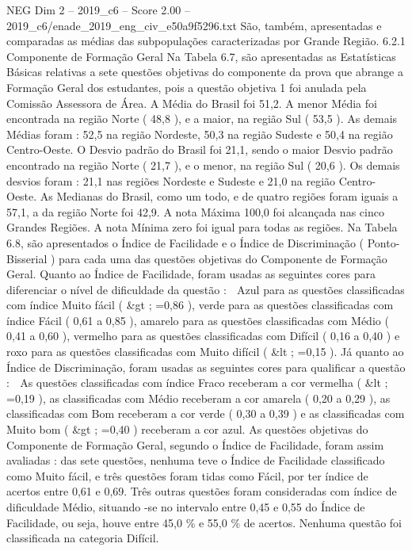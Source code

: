 \begin{textsample}{NEG Dim 2 – 2019\_c6 – Score 2.00 – 2019\_c6/enade\_2019\_eng\_civ\_e50a9f5296.txt}
São, também, apresentadas e comparadas as médias das subpopulações caracterizadas por Grande Região. 6.2.1 Componente de Formação Geral Na Tabela 6.7, são apresentadas as Estatísticas Básicas relativas a sete questões objetivas do componente da prova que abrange a Formação Geral dos estudantes, pois a questão objetiva 1 foi anulada pela Comissão Assessora de Área.
A Média do Brasil foi 51,2.
A menor Média foi encontrada na região Norte ( 48,8 ), e a maior, na região Sul ( 53,5 ).
As demais Médias foram : 52,5 na região Nordeste, 50,3 na região Sudeste e 50,4 na região Centro-Oeste.
O Desvio padrão do Brasil foi 21,1, sendo o maior Desvio padrão encontrado na região Norte ( 21,7 ), e o menor, na região Sul ( 20,6 ).
Os demais desvios foram : 21,1 nas regiões Nordeste e Sudeste e 21,0 na região Centro-Oeste.
As Medianas do Brasil, como um todo, e de quatro regiões foram iguais a 57,1, a da região Norte foi 42,9.
A nota Máxima 100,0 foi alcançada nas cinco Grandes Regiões.
A nota Mínima zero foi igual para todas as regiões.
Na Tabela 6.8, são apresentados o Índice de Facilidade e o Índice de Discriminação ( Ponto-Bisserial ) para cada uma das questões objetivas do Componente de Formação Geral.
Quanto ao Índice de Facilidade, foram usadas as seguintes cores para diferenciar o nível de dificuldade da questão :  Azul para as questões classificadas com índice Muito fácil ( \&gt ; =0,86 ), verde para as questões classificadas com índice Fácil ( 0,61 a 0,85 ), amarelo para as questões classificadas com Médio ( 0,41 a 0,60 ), vermelho para as questões classificadas com Difícil ( 0,16 a 0,40 ) e roxo para as questões classificadas com Muito difícil ( \&lt ; =0,15 ).
Já quanto ao Índice de Discriminação, foram usadas as seguintes cores para qualificar a questão :  As questões classificadas com índice Fraco receberam a cor vermelha ( \&lt ; =0,19 ), as classificadas com Médio receberam a cor amarela ( 0,20 a 0,29 ), as classificadas com Bom receberam a cor verde ( 0,30 a 0,39 ) e as classificadas com Muito bom ( \&gt ; =0,40 ) receberam a cor azul.
As questões objetivas do Componente de Formação Geral, segundo o Índice de Facilidade, foram assim avaliadas : das sete questões, nenhuma teve o Índice de Facilidade classificado como Muito fácil, e três questões foram tidas como Fácil, por ter índice de acertos entre 0,61 e 0,69.
Três outras questões foram consideradas com índice de dificuldade Médio, situando -se no intervalo entre 0,45 e 0,55 do Índice de Facilidade, ou seja, houve entre 45,0 \% e 55,0 \% de acertos.
Nenhuma questão foi classificada na categoria Difícil.

\end{textsample}
